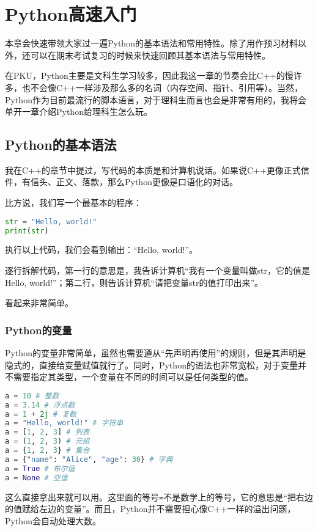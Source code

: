 \chapter{Python高速入门}

本章会快速带领大家过一遍Python的基本语法和常用特性。除了用作预习材料以外，还可以在期末考试复习的时候来快速回顾其基本语法与常用特性。

在PKU，Python主要是文科生学习较多，因此我这一章的节奏会比C++的慢许多，也不会像C++一样涉及那么多的名词（内存空间、指针、引用等）。当然，Python作为目前最流行的脚本语言，对于理科生而言也会是非常有用的，我将会单开一章介绍Python给理科生怎么玩。

\section{Python的基本语法}

我在C++的章节中提过，写代码的本质是和计算机说话。如果说C++更像正式信件，有信头、正文、落款，那么Python更像是口语化的对话。

比方说，我们写一个最基本的程序：

\begin{lstlisting}[language=python]
str = "Hello, world!"
print(str)
\end{lstlisting}

执行以上代码，我们会看到输出：“Hello, world!”。

逐行拆解代码，第一行的意思是，我告诉计算机“我有一个变量叫做str，它的值是Hello, world!”；第二行，则告诉计算机“请把变量str的值打印出来”。

看起来非常简单。

\subsection{Python的变量}

Python的变量非常简单，虽然也需要遵从“先声明再使用”的规则，但是其声明是隐式的，直接给变量赋值就行了。同时，Python的语法也非常宽松，对于变量并不需要指定其类型，一个变量在不同的时间可以是任何类型的值。

\begin{lstlisting}[language=python]
a = 10 # 整数
a = 3.14 # 浮点数
a = 1 + 2j # 复数
a = "Hello, world!" # 字符串
a = [1, 2, 3] # 列表
a = (1, 2, 3) # 元组
a = {1, 2, 3} # 集合
a = {"name": "Alice", "age": 30} # 字典
a = True # 布尔值
a = None # 空值
\end{lstlisting}
这么直接拿出来就可以用。这里面的等号\texttt{=}不是数学上的等号，它的意思是“把右边的值赋给左边的变量”。而且，Python并不需要担心像C++一样的溢出问题，Python会自动处理大数。


